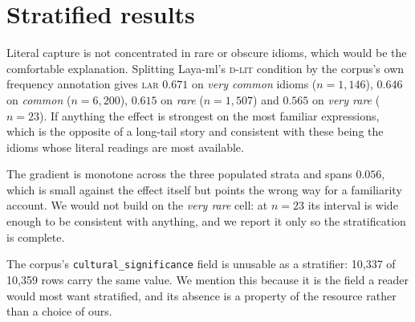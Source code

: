 \documentclass[11pt]{article}
\newcommand{\Dlit}{\textsc{d-lit}}
\newcommand{\LAR}{\textsc{lar}}
\begin{document}
\section{Stratified results}
\label{app:strata}

Literal capture is not concentrated in rare or obscure idioms, which would be
the comfortable explanation. Splitting Laya-ml's \Dlit{} condition by the
corpus's own frequency annotation gives \LAR{} $0.671$ on \emph{very common}
idioms ($n = 1{,}146$), $0.646$ on \emph{common} ($n = 6{,}200$), $0.615$ on
\emph{rare} ($n = 1{,}507$) and $0.565$ on \emph{very rare} ($n = 23$). If
anything the effect is strongest on the most familiar expressions, which is the
opposite of a long-tail story and consistent with these being the idioms whose
literal readings are most available.

The gradient is monotone across the three populated strata and spans $0.056$,
which is small against the effect itself but points the wrong way for a
familiarity account. We would not build on the \emph{very rare} cell: at $n=23$
its interval is wide enough to be consistent with anything, and we report it only
so the stratification is complete.

The corpus's \texttt{cultural\_significance} field is unusable as a stratifier:
10{,}337 of 10{,}359 rows carry the same value. We mention this because it is the
field a reader would most want stratified, and its absence is a property of the
resource rather than a choice of ours.



\end{document}
